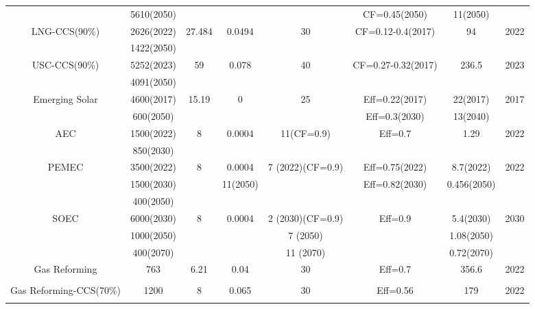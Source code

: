 \begin{landscape}
\begin{longtable}{ |*{8}{c|} }
\cite{eia_cost_2020,intergovernmental_panel_on_climate_change_climate_2014,kato_energy_2016,govindji_appraisal_2012,heger_wind_2016} & 5610(2050) &  &  &  & CF=0.45(2050) & 11(2050) &  \\
LNG-CCS(90\%) & 2626(2022) & 27.484 & 0.0494 & 30 & CF=0.12-0.4(2017) & 94 & 2022 \\
 \cite{eia_cost_2020,intergovernmental_panel_on_climate_change_climate_2014} & 1422(2050) &  & &  &  &  & \\
USC-CCS(90\%) & 5252(2023) & 59 & 0.078 & 40 & CF=0.27-0.32(2017) & 236.5 & 2023 \\
 \cite{eia_cost_2020,intergovernmental_panel_on_climate_change_climate_2014} & 4091(2050) &  &  &  &  &  & \\
Emerging Solar & 4600(2017) & 15.19 & 0 & 25 & Eff=0.22(2017) & 22(2017) & 2017 \\
 \cite{irena_solar_2012,peng_review_2013} & 600(2050) &  &  &  &Eff=0.3(2030)  & 13(2040) &  \\
\gls{AEC}  & 1500(2022) & 8 & 0.0004 & 11(CF=0.9) & Eff=0.7 & 1.29 & 2022\\
\cite{iea_technology_2015, bhandari_life_2014, cetinkaya_life_2012, burkhardt_hydrogen_2016} & 850(2030) &  &  &  &  & &  \\
\gls{PEMEC} & 3500(2022) & 8 & 0.0004 & 7 (2022)(CF=0.9) & Eff=0.75(2022) & 8.7(2022) & 2022\\
\cite{iea_technology_2015, bareis_life_2019, carmo_comprehensive_2013,ayers_research_2010,siracusano_influence_2017,schmidt_future_2017,mayyas_manufacturing_2019} & 1500(2030) &  & 11(2050)  &  & Eff=0.82(2030) & 0.456(2050)  &  \\
 & 400(2050) &  &  &  & &  &  \\
\gls{SOEC} & 6000(2030) & 8 & 0.0004 & 2 (2030)(CF=0.9) & Eff=0.9 & 5.4(2030) & 2030\\
\cite{iea_technology_2015,schmidt_future_2017,hafele_life_2016} & 1000(2050) &  &  & 7 (2050) &  & 1.08(2050) & \\
 & 400(2070) &  &  & 11 (2070) &  & 0.72(2070) & \\
Gas Reforming  & 763 & 6.21 & 0.04 & 30  & Eff=0.7 & 356.6 & 2022\\
\cite{iea_technology_2015,mehmeti_life_2018,keipi_economic_2018} & & & & & &  & \\
Gas Reforming-CCS(70\%) & 1200 & 8 & 0.065 & 30 & Eff=0.56 & 179 & 2022\\
\cite{iea_technology_2015,keipi_economic_2018,cormos_ana-maria_economic_2018} &  &  &  &  &  &  & \\

\end{longtable}
\end{landscape}
